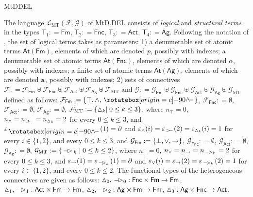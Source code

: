 \begin{entry}{MtDDEL}
\begin{clarifications}
The language $\mathcal{L}_\mathrm{MT}(\mathcal{F}, \mathcal{G})$ of  MtD.DEL consists of  {\em logical}   and {\em structural terms} in the types $\mathsf{T}_1:  = \mathsf{Fm}$, $\mathsf{T}_2: = \mathsf{Fnc}$, $\mathsf{T}_3:  = \mathsf{Act}$, $\mathsf{T}_4: = \mathsf{Ag}$. Following the notation of , the set  of logical terms takes as parameters: 1) a denumerable  set of atomic terms $\mathsf{At}(\mathsf{Fm})$, elements of which are denoted $p$, possibly with indexes; a denumerable  set of atomic terms $\mathsf{At}(\mathsf{Fnc})$, elements of which are denoted $\alpha$, possibly with indexes; a finite  set of atomic terms $\mathsf{At}(\mathsf{Ag})$, elements of which are denoted $\texttt{a}$, possibly with indexes;
 2)  sets of connectives $\mathcal{F}: = \mathcal{F}_{\mathsf{Fm}}\uplus\mathcal{F}_{\mathsf{Fnc}}\uplus\mathcal{F}_{\mathsf{Act}}\uplus\mathcal{F}_{\mathsf{Ag}}\uplus\mathcal{F}_{\mathrm{MT}}$ and $\mathcal{G}: = \mathcal{G}_{\mathsf{Fm}}\uplus\mathcal{G}_{\mathsf{Fnc}}\uplus\mathcal{G}_{\mathsf{Act}}\uplus\mathcal{G}_{\mathsf{Ag}}\uplus\mathcal{G}_{\mathrm{MT}}$ defined as follows:
$\mathcal{F}_{\mathsf{Fm}}: = \{\top, \wedge, \pdra\}$, $\mathcal{F}_{\mathsf{Fnc}}: = \emptyset$, $\mathcal{F}_{\mathsf{Act}}: = \emptyset$, $\mathcal{F}_{\mathsf{Ag}}: = \emptyset$, $\mathcal{F}_{\mathrm{MT}}: = \{\vartriangle_k\mid 0\leq k\leq 3\}$, where  $n_\top = 0$, $n_{\wedge} = n_{\,>\mkern-3.8mu\raisebox{-0.2ex}{\aoll}\,} = n_{\mand_k}  = 2$ for every $0\leq k\leq 3$, and $\varepsilon_{\pdra}(1) = \partial$ and $\varepsilon_{\wedge}(i)=\varepsilon_{\,>\mkern-3.8mu\raisebox{-0.2ex}{\aoll}\,}(2) = \varepsilon_{\mand_k}(i)  = 1$ for every $i\in \{1, 2\}$, and every $0\leq k\leq 3$, and
$\mathcal{G}_{\mathsf{Fm}}: = \{\bot, \vee, \rightarrow\}$, $\mathcal{G}_{\mathsf{Fnc}}: = \emptyset$, $\mathcal{G}_{\mathsf{Act}}: = \emptyset$, $\mathcal{G}_{\mathsf{Ag}}: = \emptyset$, $\mathcal{G}_{\mathrm{MT}}: = \{\mbox{$\,-{\mkern-3mu\vartriangleright}\,$}_k\mid 0\leq k\leq 2\}$, where  $n_\bot = 0$, $n_{\vee} = n_{\rightarrow} =n_{\,-{\mkern-3mu\vartriangleright}_k\,}  = 2$ for every $0\leq k\leq 3$, and $\varepsilon_{\rightarrow}(1) = \varepsilon_{\,-{\mkern-3mu\vartriangleright}_k\,}(1)  =  \partial$ and $\varepsilon_{\vee}(i)=\varepsilon_{\rightarrow}(2) = \varepsilon_{\,-{\mkern-3mu\vartriangleright}_k\,}(2) = 1$ for every $i\in \{1, 2\}$, and every $0\leq k\leq 2$.  The functional types of the heterogeneous connectives are given as follows:
${\vartriangle}_0, {\mbox{$\,-{\mkern-3mu\vartriangleright}\,$}}_{\! 0}   :  \mathsf{Fnc} \times \mathsf{Fm} \to \mathsf{Fm}$, 
${\vartriangle}_1, {\mbox{$\,-{\mkern-3mu\vartriangleright}\,$}}_{\! 1}  :  \mathsf{Act} \times \mathsf{Fm} \to \mathsf{Fm}$, 
${\vartriangle}_2, {\mbox{$\,-{\mkern-3mu\vartriangleright}\,$}}_{\! 2}  : \mathsf{Ag} \times \mathsf{Fm} \to \mathsf{Fm}$, 
${\vartriangle}_3  :  \mathsf{Ag} \times \mathsf{Fnc} \to \mathsf{Act}$.


\end{clarifications}
\end{entry}
